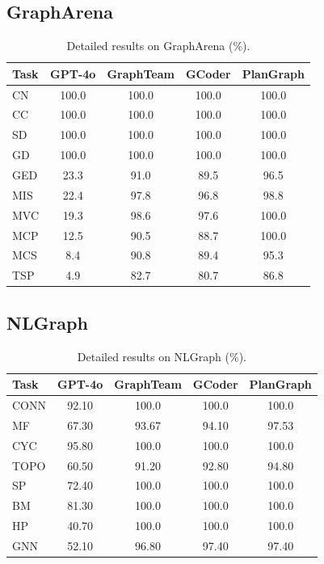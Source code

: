\documentclass[sigconf,review,anonymous]{acmart}
\begin{document}
\subsection{GraphArena}
\vspace{-6pt}
\begin{table}[H]
\centering
\caption{Detailed results on GraphArena (\%).}
\begin{tabular}{lcccc}
\toprule
Task & GPT-4o & GraphTeam & GCoder & PlanGraph \\
\midrule
CN & 100.0 & 100.0 & 100.0 & 100.0 \\
CC & 100.0 & 100.0 & 100.0 & 100.0 \\
SD & 100.0 & 100.0 & 100.0 & 100.0 \\
GD & 100.0 & 100.0 & 100.0 & 100.0 \\
GED & 23.3 & 91.0 & 89.5 & 96.5 \\
MIS & 22.4 & 97.8 & 96.8 & 98.8 \\
MVC & 19.3 & 98.6 & 97.6 & 100.0 \\
MCP & 12.5 & 90.5 & 88.7 & 100.0 \\
MCS & 8.4 & 90.8 & 89.4 & 95.3 \\
TSP & 4.9 & 82.7 & 80.7 & 86.8 \\
\bottomrule
\end{tabular}
\end{table}

\subsection{NLGraph}
\vspace{-6pt}
\begin{table}[H]
\centering
\caption{Detailed results on NLGraph (\%).}
\begin{tabular}{lcccc}
\toprule
Task & GPT-4o & GraphTeam & GCoder & PlanGraph \\
\midrule
CONN & 92.10 & 100.0 & 100.0 & 100.0 \\
MF & 67.30 & 93.67 & 94.10 & 97.53 \\
CYC & 95.80 & 100.0 & 100.0 & 100.0 \\
TOPO & 60.50 & 91.20 & 92.80 & 94.80 \\
SP & 72.40 & 100.0 & 100.0 & 100.0 \\
BM & 81.30 & 100.0 & 100.0 & 100.0 \\
HP & 40.70 & 100.0 & 100.0 & 100.0 \\
GNN & 52.10 & 96.80 & 97.40 & 97.40 \\
\bottomrule
\end{tabular}
\end{table}
\end{document}
